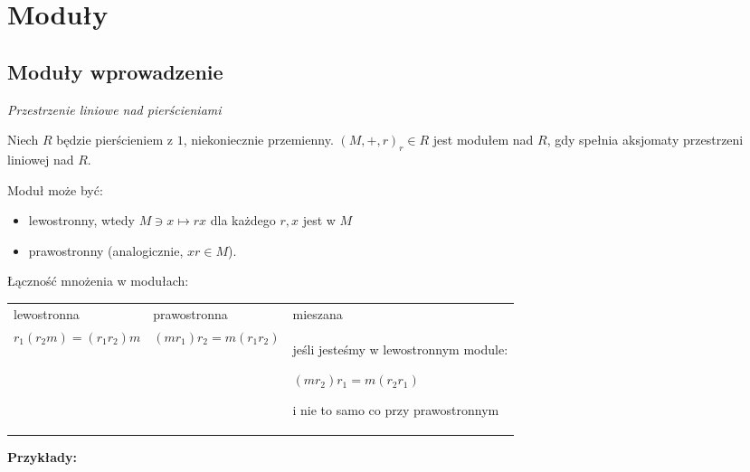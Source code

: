 \section{Moduły}

\setcounter{section}{10}
\setcounter{theorem}{2}
\subsection{Moduły wprowadzenie}

\emph{Przestrzenie liniowe nad pierścieniami}

\begin{definition}
    Niech $R$ będzie pierścieniem z $1$, niekoniecznie przemienny. $(M,+,r)_r\in R$ jest modułem nad $R$, gdy spełnia aksjomaty przestrzeni liniowej nad $R$.

    Moduł może być:
    \begin{itemize}
        \item[\PHtunny] lewostronny, wtedy $M\ni x\mapsto rx$ dla każdego $r,x$ jest w $M$
        \item[\PHtunny] prawostronny (analogicznie, $xr\in M$).
    \end{itemize}
\end{definition}

Łączność mnożenia w modułach:

\begin{tabular}{ p{5cm} p{5cm} p{5cm} }
lewostronna & prawostronna & mieszana \\

$r_1(r_2m)=(r_1r_2)m$

&

$(mr_1)r_2=m(r_1r_2)$

&

jeśli jesteśmy w lewostronnym module:

$(mr_2)r_1=m(r_2r_1)$

i nie to samo co przy prawostronnym
\end{tabular}

\textbf{Przykłady:}

